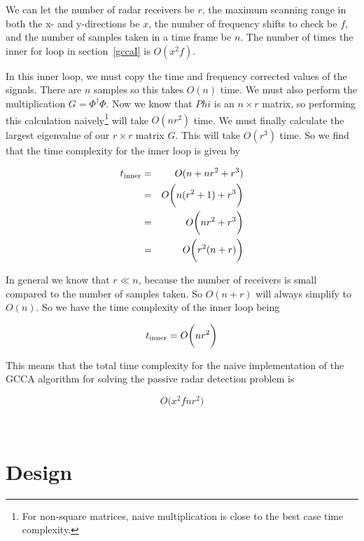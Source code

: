 \documentclass[12pt,openany,a4paper]{book}
\begin{document}
\bigskip

We can let the number of radar receivers be $r$, the maximum scanning range in both the x- and y-directions be $x$, the number of frequency shifts to check be $f$, and the number of samples taken in a time frame be $n$. The number of times the inner for loop in section~\ref{gccaI} is $O(x^2f)$.

\bigskip

In this inner loop, we must copy the time and frequency corrected values of the signals. There are $n$ samples so this takes $O(n)$ time. We must also perform the multiplication $G = \Phi^\dagger \Phi$. Now we know that $Phi$ is an $n\times r$ matrix, so performing this calculation naively\footnote{For non-square matrices, naive multiplication is close to the best case time complexity.} will take $O(nr^2)$ time. We must finally calculate the largest eigenvalue of our $r\times r$ matrix $G$. This will take $O(r^3)$ time. So we find that the time complexity for the inner loop is given by

\begin{eqnarray}
t_{\textnormal{inner}} &=& O(n + nr^2 + r^3)\\
&=& O\bigg( n(r^2 + 1) + r^3 \bigg) \\
&=& O\bigg( nr^2 + r^3 \bigg) \\
&=& O\bigg( r^2 (n + r) \bigg) \\
\end{eqnarray}

In general we know that $r \ll n$, because the number of receivers is small compared to the number of samples taken. So $O(n + r)$ will always simplify to $O(n)$. So we have the time complexity of the inner loop being

\begin{equation}
t_{\textnormal{inner}} = O\bigg( nr^2 \bigg)
\end{equation}

This means that the total time complexity for the naive implementation of the GCCA algorithm for solving the passive radar detection problem is

\begin{equation}
\label{eqn:time1}
O\bigg(x^2f nr^2 \bigg)
\end{equation}

\cleardoublepage

\verb+ +
\cleardoublepage

\chapter{Design}
\end{document}
